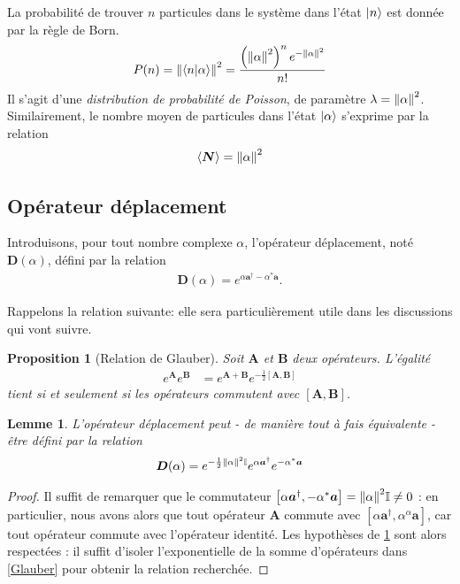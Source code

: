 \documentclass[11pt,oneside,a4paper]{article}
\newtheorem{lemma}[theorem]{Lemme}
\newtheorem{property}[theorem]{Proposition}
\begin{document}
La probabilité de trouver $n$ particules dans le système dans l'état $\ket{n}$ est donnée par la règle de Born.
\begin{align*}
  P(n) = \norm{\braket{n}{\alpha}}^2 = \frac{\left(\norm{\alpha}^{2}\right)^ne^{-\norm{\alpha}^2}}{n!}
\end{align*}
Il s'agit d'une \emph{distribution de probabilité de Poisson}, de paramètre $\lambda = \norm{\alpha}^2$.\\

Similairement, le nombre moyen de particules dans l'état $\ket{\alpha}$ s'exprime par la relation
\begin{align}
  \expval{\bm{N}} = \norm{\alpha}^2\label{eq:mean N}
\end{align}

\subsection{Opérateur déplacement} \label{opérateur déplacement}
Introduisons, pour tout nombre complexe $\alpha$, l'opérateur déplacement, noté $\bm{D}(\alpha)$, défini par la relation
\begin{align}
  \label{eq:operateur deplacement}
  \bm{D}(\alpha) = e^{\alpha \bm{a}^\dagger-\alpha^*\bm{a}}.
\end{align}

Rappelons la relation suivante: elle sera particulièrement utile dans les discussions qui vont suivre.

\begin{property}[Relation de Glauber]
  \label{prop Glauber}
  Soit $\bm{A}$ et $\bm{B}$ deux opérateurs. L'égalité
  \begin{align}
    \label{Glauber}
    e^{\bm{A}}e^{\bm{B}} &= e^{\bm{A}+\bm{B}}e^{-\frac{1}{2}\left[\bm{A},\bm{B}\right]}
  \end{align}
  tient si et seulement si les opérateurs commutent avec $\left[\bm{A},\bm{B}\right]$.
\end{property}

\begin{lemma}
  \label{lemme displacement}
  L'opérateur déplacement peut - de manière tout à fais équivalente - être défini par la relation
  \begin{align}
    \bm{D}(\alpha) = e^{-\frac{1}{2}\norm{\alpha}^2\mathbb{I}}e^{\alpha\bm{a}^\dagger}e^{-\alpha^*\bm{a}}\label{eq:formulation equivalente operateur deplacement}
  \end{align}
\end{lemma}
\begin{proof}
  Il suffit de remarquer que le commutateur $\left[\alpha\bm{a}^\dagger,-\alpha^*\bm{a}\right] = \norm{\alpha}^2\mathbb{I} \neq 0$ : en particulier, nous avons alors que tout opérateur $\bm{A}$ commute avec $\left[\alpha\bm{a}^\dagger,\alpha^\alpha\bm{a}\right]$, car tout opérateur commute avec l'opérateur identité. Les hypothèses de \ref{prop Glauber} sont alors respectées : il suffit d'isoler l'exponentielle de la somme d'opérateurs dans \eqref{Glauber} pour obtenir la relation recherchée.
\end{proof}
\end{document}
